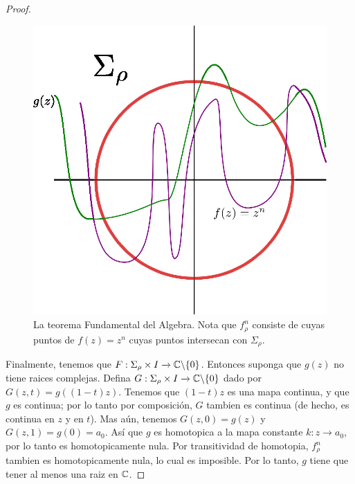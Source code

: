 \begin{proof}
    \begin{figure}[h]
        \centering
        \includegraphics[scale=0.5]{Figures/fund_thm_algebra.eps}
        \caption{La teorema Fundamental del Algebra. Nota que $f^n_\rho$ consiste de
        cuyas puntos de $f(z)=z^n$ cuyas puntos intersecan con $\Sigma_\rho$.}
        \label{fig_16}
    \end{figure}

    Finalmente, tenemos que $F:\Sigma_\rho \times I \xrightarrow{}
    \mathbb{C}\backslash\{0\}$. Entonces suponga que $g(z)$ no tiene raices complejas.
    Defina $G:\Sigma_\rho \times I \xrightarrow{} \mathbb{C}\backslash\{0\}$ dado por
    $G(z,t)=g((1-t)z)$. Tenemos que $(1-t)z$ es una mapa continua, y que $g$ es
    continua; por lo tanto por composici\'on,  $G$ tambien es continua  (de
    hecho, es continua en $z$ y en  $t$). Mas a\'un, tenemos $G(z,0)=g(z)$ y
    $G(z,1)=g(0)=a_0$. As\'i que $g$ es homotopica a la mapa constante  $k:z
    \xrightarrow{} a_0$, por lo tanto es homotopicamente nula. Por transitividad
    de homotopia, $f^n_\rho$ tambien es homotopicamente nula, lo cual es
    imposible. Por lo tanto,  $g$ tiene que tener al menos una raiz en $\mathbb{C}$.
\end{proof}
